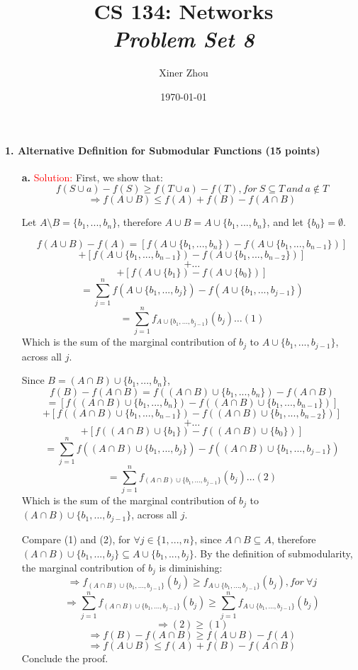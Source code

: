 \documentclass[11pt]{article} %
\title{CS 134: Networks \\ \emph{Problem Set 8}}
\author{Xiner Zhou}
\date{\today} %
\begin{document}
 
\maketitle

\paragraph{1. Alternative Definition for Submodular Functions (15 points)}
 
\begin{itemize}
\item[\textbf{a. }]  
\textcolor{red}{Solution:} 
First, we show that: 
$$f(S \cup a)-f(S) \ge f(T \cup a)-f(T), for \ S \subseteq T \ and \ a\notin T $$
$$ \Rightarrow f(A \cup B) \le f(A)+f(B)-f(A \cap B) $$

Let $A\setminus B=\{b_1,...,b_n \}$, therefore $A\cup B=A \cup \{b_1,...,b_n \}$, and let $\{b_0\}=\emptyset$.

$$ f(A \cup B)-f(A)=[f(A \cup \{b_1,...,b_n \})-f(A \cup \{b_1,...,b_{n-1} \})]$$
$$ +[f(A \cup \{b_1,...,b_{n-1} \})-f(A \cup \{b_1,...,b_{n-2} \})]$$
$$ + \dots$$
$$ +[f(A \cup \{b_1 \})-f(A \cup \{b_0\})]$$
$$=\sum_{j=1}^{n} f(A \cup \{b_1,...,b_j \})-f(A \cup \{b_1,...,b_{j-1} \})$$ 
$$=\sum_{j=1}^{n} f_{A \cup \{b_1,...,b_{j-1} \}} (b_j) \dots (1)$$ 
Which is the sum of the marginal contribution of $b_j$ to $A \cup \{b_1,...,b_{j-1} \}$, across all $j$.

Since $B=(A \cap B) \cup \{b_1,...,b_n \}$, 
$$ f(B)-f(A \cap B)=f((A \cap B) \cup \{b_1,...,b_n \})-f(A \cap B)$$
$$=[f((A \cap B) \cup \{b_1,...,b_n \})-f((A \cap B) \cup \{b_1,...,b_{n-1} \})]$$
$$ +[f((A \cap B) \cup \{b_1,...,b_{n-1} \})-f((A \cap B) \cup \{b_1,...,b_{n-2} \})]$$
$$ + \dots$$
$$ +[f((A \cap B) \cup \{b_1 \})-f((A \cap B) \cup \{b_0\})]$$
$$=\sum_{j=1}^{n} f((A \cap B) \cup \{b_1,...,b_j \})-f((A \cap B) \cup \{b_1,...,b_{j-1} \})$$ 
$$=\sum_{j=1}^{n} f_{(A \cap B) \cup \{b_1,...,b_{j-1} \}} (b_j) \dots (2)$$ 
Which is the sum of the marginal contribution of $b_j$ to $ (A \cap B) \cup \{b_1,...,b_{j-1} \}$, across all $j$.

Compare (1) and (2), for $\forall j \in \{ 1,...,n\}$, since $A\cap B \subseteq A$, therefore $ (A \cap B) \cup \{b_1,...,b_j \} \subseteq A \cup \{b_1,...,b_j \}$. By the definition of submodularity, the marginal contribution of $b_j$ is diminishing:
$$ \Rightarrow f_{(A \cap B) \cup \{b_1,...,b_{j-1} \}} (b_j) \ge  f_{A \cup \{b_1,...,b_{j-1} \}} (b_j), for \ \forall j $$
$$ \Rightarrow \sum_{j=1}^{n} f_{(A \cap B) \cup \{b_1,...,b_{j-1} \}} (b_j) \ge \sum_{j=1}^{n} f_{A \cup \{b_1,...,b_{j-1} \}} (b_j) $$
$$ \Rightarrow (2) \ge (1) $$
$$ \Rightarrow f(B)-f(A \cap B) \ge f(A \cup B)-f(A) $$ 
$$ \Rightarrow f(A \cup B) \le f(A)+f(B)-f(A \cap B) $$
Conclude the proof.  


\end{itemize}
\end{document}

